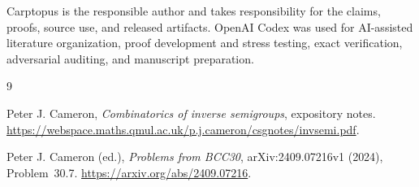 \documentclass[11pt]{article}
\begin{document}
Carptopus is the responsible author and takes responsibility for the claims,
proofs, source use, and released artifacts. OpenAI Codex was used for
AI-assisted literature organization, proof development and stress testing,
exact verification, adversarial auditing, and manuscript preparation.

\begin{thebibliography}{9}

Peter J. Cameron,
\emph{Combinatorics of inverse semigroups}, expository notes.
\url{https://webspace.maths.qmul.ac.uk/p.j.cameron/csgnotes/invsemi.pdf}.

Peter J. Cameron (ed.),
\emph{Problems from BCC30},
arXiv:2409.07216v1 (2024), Problem~30.7.
\url{https://arxiv.org/abs/2409.07216}.

\end{thebibliography}
\end{document}
